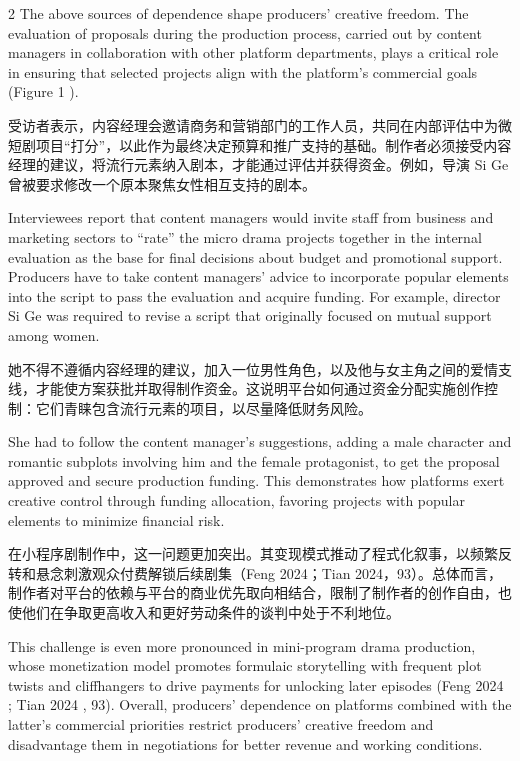 \documentclass[10pt,a4paper]{article}
\begin{document}
\begin{paracol}{2}
\switchcolumn
The above sources of dependence shape producers’ creative freedom. The evaluation of proposals during the production process, carried out by content managers in collaboration with other platform departments, plays a critical role in ensuring that selected projects align with the platform’s commercial goals (Figure 1 ).\par
\switchcolumn*
受访者表示，内容经理会邀请商务和营销部门的工作人员，共同在内部评估中为微短剧项目“打分”，以此作为最终决定预算和推广支持的基础。制作者必须接受内容经理的建议，将流行元素纳入剧本，才能通过评估并获得资金。例如，导演 Si Ge 曾被要求修改一个原本聚焦女性相互支持的剧本。\par
\switchcolumn
Interviewees report that content managers would invite staff from business and marketing sectors to “rate” the micro drama projects together in the internal evaluation as the base for final decisions about budget and promotional support. Producers have to take content managers’ advice to incorporate popular elements into the script to pass the evaluation and acquire funding. For example, director Si Ge was required to revise a script that originally focused on mutual support among women.\par
\switchcolumn*
她不得不遵循内容经理的建议，加入一位男性角色，以及他与女主角之间的爱情支线，才能使方案获批并取得制作资金。这说明平台如何通过资金分配实施创作控制：它们青睐包含流行元素的项目，以尽量降低财务风险。\par
\switchcolumn
She had to follow the content manager’s suggestions, adding a male character and romantic subplots involving him and the female protagonist, to get the proposal approved and secure production funding. This demonstrates how platforms exert creative control through funding allocation, favoring projects with popular elements to minimize financial risk.\par
\switchcolumn*
在小程序剧制作中，这一问题更加突出。其变现模式推动了程式化叙事，以频繁反转和悬念刺激观众付费解锁后续剧集（Feng 2024；Tian 2024，93）。总体而言，制作者对平台的依赖与平台的商业优先取向相结合，限制了制作者的创作自由，也使他们在争取更高收入和更好劳动条件的谈判中处于不利地位。\par
\switchcolumn
This challenge is even more pronounced in mini-program drama production, whose monetization model promotes formulaic storytelling with frequent plot twists and cliffhangers to drive payments for unlocking later episodes (Feng 2024 ; Tian 2024 , 93). Overall, producers’ dependence on platforms combined with the latter’s commercial priorities restrict producers’ creative freedom and disadvantage them in negotiations for better revenue and working conditions.\par
\switchcolumn*
\end{paracol}
\end{document}
